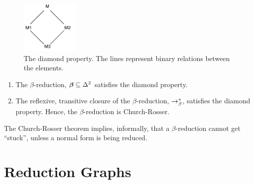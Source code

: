 \begin{figure}[htbp]
	\centering
		\includegraphics[height=1in]{../images/diamond.pdf}
	\caption[The diamond property.]
	{The diamond property. The lines represent binary relations between the elements.}
	\label{fig:images_diamond}
\end{figure}

\begin{theorem}\mbox{}
	\begin{enumerate}
		\item The $\beta$-reduction, $\boldsymbol\beta\subseteq\Delta^2$ satisfies the
		diamond property.
		\item The reflexive, transitive closure of the $\beta$-reduction, $\rightarrow_\beta^*$, satisfies
		the diamond property. Hence, the $\beta$-reduction is Church-Rosser.
	\end{enumerate}
\end{theorem}

The Church-Rosser theorem implies, informally, that a $\beta$-reduction cannot
get ``stuck'', unless a normal form is being reduced.

\section{Reduction Graphs}

